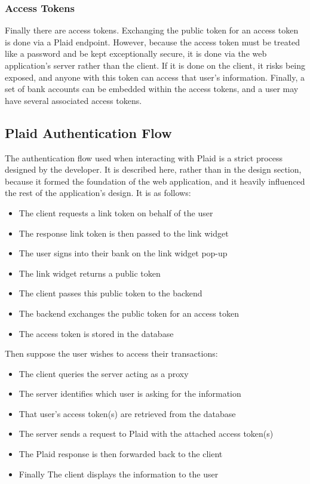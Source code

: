 \subsubsection{Access Tokens}
Finally there are access tokens. Exchanging the public token for an access token is done via a Plaid endpoint. However, because the access token must be treated like a password and be kept exceptionally secure, it is done via the web application's server rather than the client. If it is done on the client, it risks being exposed, and anyone with this token can access that user's information. Finally, a set of bank accounts can be embedded within the access tokens, and a user may have several associated access tokens.

\subsection{Plaid Authentication Flow}
\label{sec:plaid-authentication-flow}
The authentication flow used when interacting with Plaid is a strict process designed by the developer. It is described here, rather than in the design section, because it formed the foundation of the web application, and it heavily influenced the rest of the application's design. It is as follows:

\begin{itemize}
    \item The client requests a link token on behalf of the user
    \item The response link token is then passed to the link widget
    \item The user signs into their bank on the link widget pop-up
    \item The link widget returns a public token
    \item The client passes this public token to the backend
    \item The backend exchanges the public token for an access token
    \item The access token is stored in the database
\end{itemize}

Then suppose the user wishes to access their transactions:

\begin{itemize}
    \item The client queries the server acting as a proxy
    \item The server identifies which user is asking for the information
    \item That user's access token(s) are retrieved from the database
    \item The server sends a request to Plaid with the attached access token(s)
    \item The Plaid response is then forwarded back to the client
    \item Finally The client displays the information to the user
\end{itemize}

